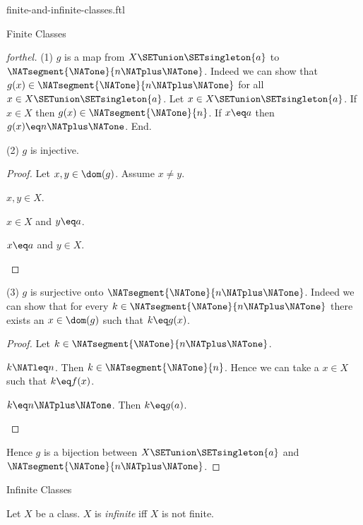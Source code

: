 \documentclass{naproche-library}
\begin{document}
\begin{smodule}[title=Finite and Infinite Classes]{finite-and-infinite-classes.ftl}
\begin{sfragment}{Finite Classes}
\begin{proof}[forthel]
    (1) $g$ is a map from $X \SETunion \SETsingleton{a}$ to $\NATsegment{\NATone}{n \NATplus \NATone}$.
    Indeed we can show that $g(x) \in \NATsegment{\NATone}{n \NATplus \NATone}$ for all $x \in X \SETunion \SETsingleton{a}$.
      Let $x \in X \SETunion \SETsingleton{a}$.
      If $x \in X$ then $g(x) \in \NATsegment{\NATone}{n}$.
      If $x \eq a$ then $g(x) \eq n \NATplus \NATone$.
    End.

    (2) $g$ is injective.
    \begin{proof}
      Let $x, y \in \dom(g)$.
      Assume $x \neq y$.
      
      \begin{case}{$x, y \in X$.} \end{case}

      \begin{case}{$x \in X$ and $y \eq a$.} \end{case}

      \begin{case}{$x \eq a$ and $y \in X$.} \end{case}
    \end{proof}

    (3) $g$ is surjective onto $\NATsegment{\NATone}{n \NATplus \NATone}$.
    Indeed we can show that for every $k \in \NATsegment{\NATone}{n \NATplus \NATone}$ there exists an $x \in \dom(g)$ such that $k \eq g(x)$.
    \begin{proof}
      Let $k \in \NATsegment{\NATone}{n \NATplus \NATone}$.

      \begin{case}{$k \NATleq n$.}
        Then $k \in \NATsegment{\NATone}{n}$.
        Hence we can take a $x \in X$ such that $k \eq f(x)$.
      \end{case}

      \begin{case}{$k \eq n \NATplus \NATone$.}
        Then $k \eq g(a)$.
      \end{case}
    \end{proof}

    Hence $g$ is a bijection between $X \SETunion \SETsingleton{a}$ and $\NATsegment{\NATone}{n \NATplus \NATone}$.
  \end{proof}
\end{sfragment}

\begin{sfragment}{Infinite Classes}
  \begin{definition}[forthel,id=FOUNDATIONS_14_6612510618681344]
    Let $X$ be a class.
    $X$ is \emph{infinite} iff $X$ is not finite.
  \end{definition}


\end{sfragment}
\end{smodule}
\end{document}
